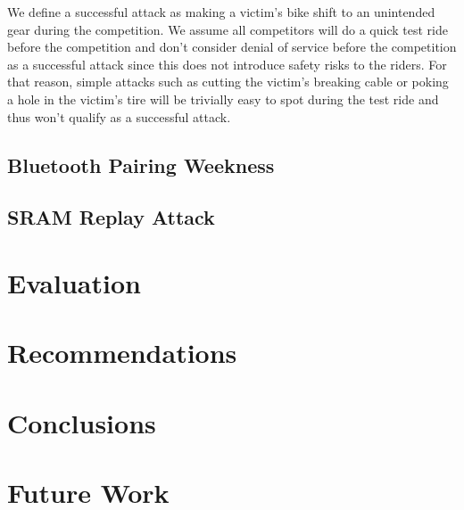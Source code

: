 \documentclass[letterpaper,twocolumn,10pt]{article}
\begin{document}
We define a successful attack as making a victim's bike shift to an unintended gear during the competition. We assume all competitors will do a quick test ride before the competition and don't consider denial of service before the competition as a successful attack since this does not introduce safety risks to the riders. For that reason, simple attacks such as cutting the victim's breaking cable or poking a hole in the victim's tire will be trivially easy to spot during the test ride and thus won't qualify as a successful attack.


\subsection{Bluetooth Pairing Weekness}


\subsection{SRAM Replay Attack}



\section{Evaluation}


\section{Recommendations}


\section{Conclusions}




\section{Future Work}




 {\normalsize 
  }

\end{document}
